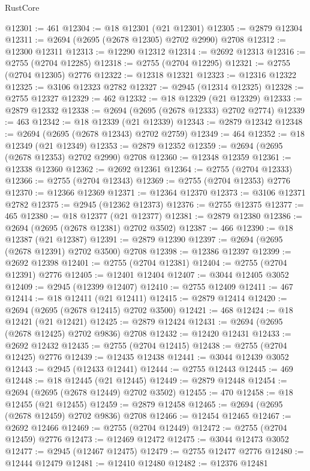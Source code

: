 \begin{lexlean}{RustCore}
\begin{coremodule}
@12301 := 461
@12304 := @18 @12301 (@21 @12301)
@12305 := @2879 @12304
@12311 := @2694 (@2695 (@2678 @12305) @2702 @2990) @2708
@12312 := @12300 @12311
@12313 := @12290 @12312
@12314 := @2692 @12313
@12316 := @2755 (@2704 @12285)
@12318 := @2755 (@2704 @12295)
@12321 := @2755 (@2704 @12305) @2776
@12322 := @12318 @12321
@12323 := @12316 @12322
@12325 := @3106 @12323 @2782
@12327 := @2945 (@12314 @12325)
@12328 := @2755 @12327
@12329 := 462
@12332 := @18 @12329 (@21 @12329)
@12333 := @2879 @12332
@12338 := @2694 (@2695 (@2678 @12333) @2702 @2774)
@12339 := 463
@12342 := @18 @12339 (@21 @12339)
@12343 := @2879 @12342
@12348 := @2694 (@2695 (@2678 @12343) @2702 @2759)
@12349 := 464
@12352 := @18 @12349 (@21 @12349)
@12353 := @2879 @12352
@12359 := @2694 (@2695 (@2678 @12353) @2702 @2990) @2708
@12360 := @12348 @12359
@12361 := @12338 @12360
@12362 := @2692 @12361
@12364 := @2755 (@2704 @12333)
@12366 := @2755 (@2704 @12343)
@12369 := @2755 (@2704 @12353) @2776
@12370 := @12366 @12369
@12371 := @12364 @12370
@12373 := @3106 @12371 @2782
@12375 := @2945 (@12362 @12373)
@12376 := @2755 @12375
@12377 := 465
@12380 := @18 @12377 (@21 @12377)
@12381 := @2879 @12380
@12386 := @2694 (@2695 (@2678 @12381) @2702 @3502)
@12387 := 466
@12390 := @18 @12387 (@21 @12387)
@12391 := @2879 @12390
@12397 := @2694 (@2695 (@2678 @12391) @2702 @3500) @2708
@12398 := @12386 @12397
@12399 := @2692 @12398
@12401 := @2755 (@2704 @12381)
@12404 := @2755 (@2704 @12391) @2776
@12405 := @12401 @12404
@12407 := @3044 @12405 @3052
@12409 := @2945 (@12399 @12407)
@12410 := @2755 @12409
@12411 := 467
@12414 := @18 @12411 (@21 @12411)
@12415 := @2879 @12414
@12420 := @2694 (@2695 (@2678 @12415) @2702 @3500)
@12421 := 468
@12424 := @18 @12421 (@21 @12421)
@12425 := @2879 @12424
@12431 := @2694 (@2695 (@2678 @12425) @2702 @9836) @2708
@12432 := @12420 @12431
@12433 := @2692 @12432
@12435 := @2755 (@2704 @12415)
@12438 := @2755 (@2704 @12425) @2776
@12439 := @12435 @12438
@12441 := @3044 @12439 @3052
@12443 := @2945 (@12433 @12441)
@12444 := @2755 @12443
@12445 := 469
@12448 := @18 @12445 (@21 @12445)
@12449 := @2879 @12448
@12454 := @2694 (@2695 (@2678 @12449) @2702 @3502)
@12455 := 470
@12458 := @18 @12455 (@21 @12455)
@12459 := @2879 @12458
@12465 := @2694 (@2695 (@2678 @12459) @2702 @9836) @2708
@12466 := @12454 @12465
@12467 := @2692 @12466
@12469 := @2755 (@2704 @12449)
@12472 := @2755 (@2704 @12459) @2776
@12473 := @12469 @12472
@12475 := @3044 @12473 @3052
@12477 := @2945 (@12467 @12475)
@12479 := @2755 @12477 @2776
@12480 := @12444 @12479
@12481 := @12410 @12480
@12482 := @12376 @12481

\end{coremodule}
\end{lexlean}
